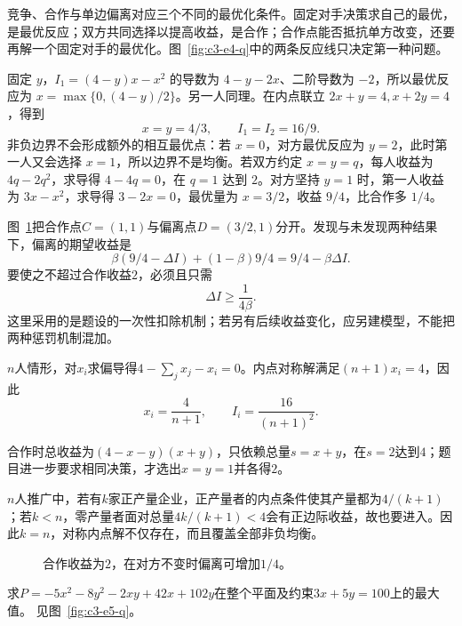 \begin{solution}
竞争、合作与单边偏离对应三个不同的最优化条件。固定对手决策求自己的最优，是最优反应；双方共同选择以提高收益，是合作；合作点能否抵抗单方改变，还要再解一个固定对手的最优化。图~\ref{fig:c3-e4-q}中的两条反应线只决定第一种问题。


固定 $y$，$I_1=(4-y)x-x^2$ 的导数为 $4-y-2x$、二阶导数为 $-2$，所以最优反应为 $x=\max\{0,(4-y)/2\}$。另一人同理。在内点联立 $2x+y=4,x+2y=4$，得到
\[x=y=4/3,\qquad I_1=I_2=16/9.\]
非负边界不会形成额外的相互最优点：若 $x=0$，对方最优反应为 $y=2$，此时第一人又会选择 $x=1$，所以边界不是均衡。若双方约定 $x=y=q$，每人收益为 $4q-2q^2$，求导得 $4-4q=0$，在 $q=1$ 达到 $2$。对方坚持 $y=1$ 时，第一人收益为 $3x-x^2$，求导得 $3-2x=0$，最优量为 $x=3/2$，收益 $9/4$，比合作多 $1/4$。

图~\ref{fig:c3-e4-s}把合作点$C=(1,1)$与偏离点$D=(3/2,1)$分开。发现与未发现两种结果下，偏离的期望收益是
\[\beta(9/4-\Delta I)+(1-\beta)9/4=9/4-\beta\Delta I.\]
要使之不超过合作收益$2$，必须且只需
\[\boxed{\Delta I\ge\frac1{4\beta}}.\]
这里采用的是题设的一次性扣除机制；若另有后续收益变化，应另建模型，不能把两种惩罚机制混加。

$n$人情形，对$x_i$求偏导得$4-\sum_jx_j-x_i=0$。内点对称解满足$(n+1)x_i=4$，因此
\[\boxed{x_i=\frac4{n+1},\qquad I_i=\frac{16}{(n+1)^2}}.\]


合作时总收益为$(4-x-y)(x+y)$，只依赖总量$s=x+y$，在$s=2$达到$4$；题目进一步要求相同决策，才选出$x=y=1$并各得$2$。

$n$人推广中，若有$k$家正产量企业，正产量者的内点条件使其产量都为$4/(k+1)$；若$k<n$，零产量者面对总量$4k/(k+1)<4$会有正边际收益，故也要进入。因此$k=n$，对称内点解不仅存在，而且覆盖全部非负均衡。

\begin{figure}[H]\centering
{}
\caption{合作收益为$2$，在对方不变时偏离可增加$1/4$。}\label{fig:c3-e4-s}
\end{figure}
\end{solution}

\begin{example}[凹二次函数及线性约束]\label{ex:c3-e5}
求$P=-5x^2-8y^2-2xy+42x+102y$在整个平面及约束$3x+5y=100$上的最大值。 见图~\ref{fig:c3-e5-q}。
\end{example}

